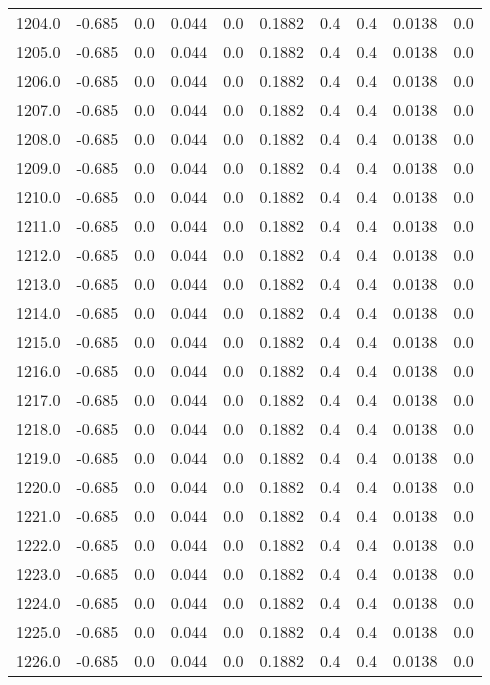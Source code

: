 \begin{longtable}{lrrrrrrrrr}
1204.0 & -0.685 & 0.0 & 0.044 & 0.0 & 0.1882 & 0.4 & 0.4 & 0.0138 & 0.0 \\
1205.0 & -0.685 & 0.0 & 0.044 & 0.0 & 0.1882 & 0.4 & 0.4 & 0.0138 & 0.0 \\
1206.0 & -0.685 & 0.0 & 0.044 & 0.0 & 0.1882 & 0.4 & 0.4 & 0.0138 & 0.0 \\
1207.0 & -0.685 & 0.0 & 0.044 & 0.0 & 0.1882 & 0.4 & 0.4 & 0.0138 & 0.0 \\
1208.0 & -0.685 & 0.0 & 0.044 & 0.0 & 0.1882 & 0.4 & 0.4 & 0.0138 & 0.0 \\
1209.0 & -0.685 & 0.0 & 0.044 & 0.0 & 0.1882 & 0.4 & 0.4 & 0.0138 & 0.0 \\
1210.0 & -0.685 & 0.0 & 0.044 & 0.0 & 0.1882 & 0.4 & 0.4 & 0.0138 & 0.0 \\
1211.0 & -0.685 & 0.0 & 0.044 & 0.0 & 0.1882 & 0.4 & 0.4 & 0.0138 & 0.0 \\
1212.0 & -0.685 & 0.0 & 0.044 & 0.0 & 0.1882 & 0.4 & 0.4 & 0.0138 & 0.0 \\
1213.0 & -0.685 & 0.0 & 0.044 & 0.0 & 0.1882 & 0.4 & 0.4 & 0.0138 & 0.0 \\
1214.0 & -0.685 & 0.0 & 0.044 & 0.0 & 0.1882 & 0.4 & 0.4 & 0.0138 & 0.0 \\
1215.0 & -0.685 & 0.0 & 0.044 & 0.0 & 0.1882 & 0.4 & 0.4 & 0.0138 & 0.0 \\
1216.0 & -0.685 & 0.0 & 0.044 & 0.0 & 0.1882 & 0.4 & 0.4 & 0.0138 & 0.0 \\
1217.0 & -0.685 & 0.0 & 0.044 & 0.0 & 0.1882 & 0.4 & 0.4 & 0.0138 & 0.0 \\
1218.0 & -0.685 & 0.0 & 0.044 & 0.0 & 0.1882 & 0.4 & 0.4 & 0.0138 & 0.0 \\
1219.0 & -0.685 & 0.0 & 0.044 & 0.0 & 0.1882 & 0.4 & 0.4 & 0.0138 & 0.0 \\
1220.0 & -0.685 & 0.0 & 0.044 & 0.0 & 0.1882 & 0.4 & 0.4 & 0.0138 & 0.0 \\
1221.0 & -0.685 & 0.0 & 0.044 & 0.0 & 0.1882 & 0.4 & 0.4 & 0.0138 & 0.0 \\
1222.0 & -0.685 & 0.0 & 0.044 & 0.0 & 0.1882 & 0.4 & 0.4 & 0.0138 & 0.0 \\
1223.0 & -0.685 & 0.0 & 0.044 & 0.0 & 0.1882 & 0.4 & 0.4 & 0.0138 & 0.0 \\
1224.0 & -0.685 & 0.0 & 0.044 & 0.0 & 0.1882 & 0.4 & 0.4 & 0.0138 & 0.0 \\
1225.0 & -0.685 & 0.0 & 0.044 & 0.0 & 0.1882 & 0.4 & 0.4 & 0.0138 & 0.0 \\
1226.0 & -0.685 & 0.0 & 0.044 & 0.0 & 0.1882 & 0.4 & 0.4 & 0.0138 & 0.0 \\

\end{longtable}
